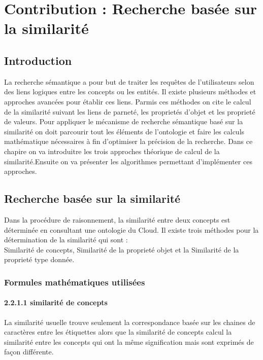 \chapter{Contribution : Recherche basée sur la similarité} \label{intro}
\section{Introduction}
    La recherche sémantique a pour but de traiter les requêtes de l'utilisateurs selon des liens logiques entre les concepts ou les entités. Il existe plusieurs méthodes et approches avancées pour établir ces liens. Parmis ces méthodes on cite le calcul de la similarité suivant les liens de parneté, les proprietés d'objet et les proprieté de valeurs.
    Pour appliquer le mécanisme de recherche sémantique basé sur la similarité on doit parcourir tout les éléments de l'ontologie et faire les calculs mathématique nécessaires à fin d'optimiser la précision de la recherche.
    Dans ce chapire on va introduitre les trois approches théorique de calcul de la similarité.Ensuite on va présenter les algorithmes permettant d'implémenter ces approches.

\section{Recherche basée sur la similarité}
        Dans la procédure de raisonnement, la similarité entre deux concepts est déterminée en consultant une ontologie du Cloud. Il existe trois méthodes pour la détermination de la similarité qui sont :\\
		Similarité de concepts, Similarité de la proprieté objet et la Similarité de la proprieté type donnée.


    \subsection{Formules mathématiques utilisées}

        \subsubsection{2.2.1.1 similarité de concepts}
            La similarité usuelle trouve seulement  la correspondance basée sur les chaines  de caractères entre les étiquettes alors que la similarité de concepts calcul la similarité entre les concepts qui ont la même signification mais sont exprimés  de façon différente.\\



